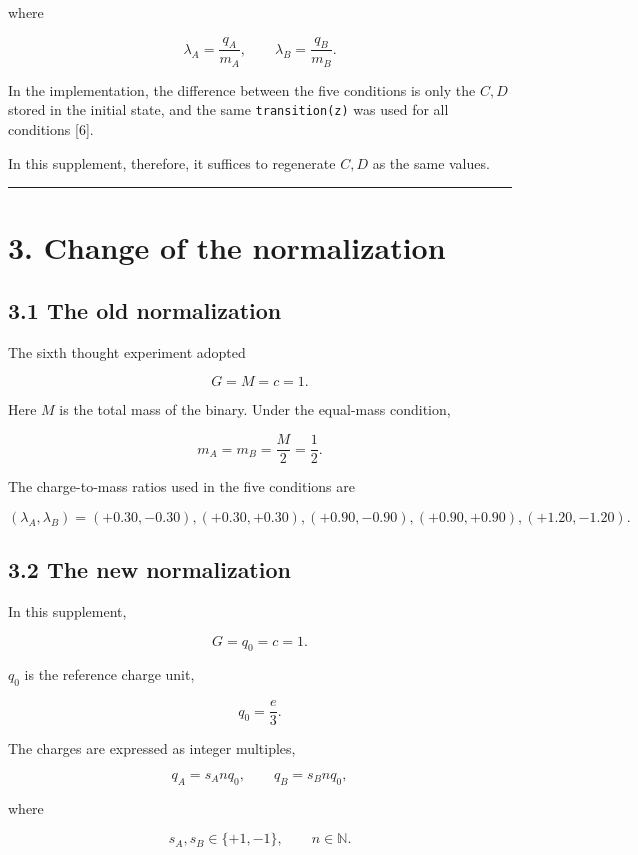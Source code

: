 \documentclass[
  a4paper,
]{article}
\begin{document}
where

\[
\lambda_A=\frac{q_A}{m_A},\qquad
\lambda_B=\frac{q_B}{m_B}.
\]

In the implementation, the difference between the five conditions is
only the \(C,D\) stored in the initial state, and the same
\texttt{transition(z)} was used for all conditions {[}6{]}.

In this supplement, therefore, it suffices to regenerate \(C,D\) as the
same values.

\begin{center}\rule{0.5\linewidth}{0.5pt}\end{center}

\section{3. Change of the
normalization}\label{change-of-the-normalization}

\subsection{3.1 The old normalization}\label{the-old-normalization}

The sixth thought experiment adopted

\[
G=M=c=1.
\]

Here \(M\) is the total mass of the binary. Under the equal-mass
condition,

\[
m_A=m_B=\frac{M}{2}=\frac12.
\]

The charge-to-mass ratios used in the five conditions are

\[
(\lambda_A,\lambda_B)
=
(+0.30,-0.30),
(+0.30,+0.30),
(+0.90,-0.90),
(+0.90,+0.90),
(+1.20,-1.20).
\]

\subsection{3.2 The new normalization}\label{the-new-normalization}

In this supplement,

\[
\boxed{G=q_0=c=1}.
\]

\(q_0\) is the reference charge unit,

\[
q_0=\frac{e}{3}.
\]

The charges are expressed as integer multiples,

\[
q_A=s_A n q_0,
\qquad
q_B=s_B n q_0,
\]

where

\[
s_A,s_B\in\{+1,-1\},\qquad n\in\mathbb N.
\]
\end{document}

